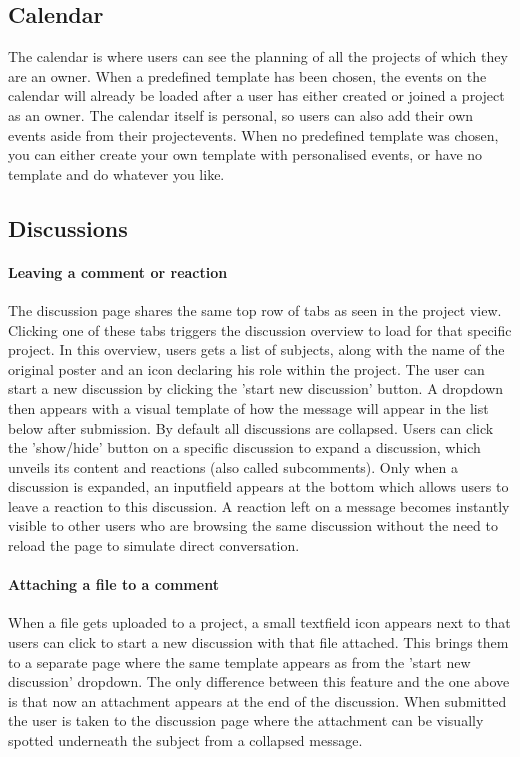 \subsection{Calendar}

The calendar is where users can see the planning of all the projects of which they are an owner.
When a predefined template has been chosen, the events on the calendar will already be loaded after
a user has either created or joined a project as an owner. The calendar itself is personal, so users can also add their own events aside from their projectevents. When no predefined template was chosen, you can either
create your own template with personalised events, or have no template and do whatever you like.

\subsection{Discussions}

\paragraph{Leaving a comment or reaction}

The discussion page shares the same top row of tabs as seen in the project view. Clicking one of these tabs
triggers the discussion overview to load for that specific project. In this overview, users gets a
list of subjects, along with the name of the original poster and an icon declaring his role within the project. The user can start a new discussion by clicking the 'start new discussion' button. A dropdown 
then appears with a visual template of how the message will appear in the list below after submission. By default all discussions are collapsed. Users can click the 'show/hide' button on a specific discussion to 
expand a discussion, which unveils its content and reactions (also called subcomments). 
Only when a discussion is expanded, an inputfield appears at the bottom which allows users to leave a reaction to this discussion. 
A reaction left on a message becomes instantly visible to other users who are browsing the same discussion without the need to reload the page to simulate direct conversation.

\paragraph{Attaching a file to a comment}

When a file gets uploaded to a project, a small textfield icon appears next to that users can click to start
a new discussion with that file attached. This brings them to a separate page where the same template appears
as from the 'start new discussion' dropdown. The only difference between this feature and the one above is that now an attachment appears at the end of the discussion. 
When submitted the user is taken to the discussion page where the attachment can be visually spotted underneath the subject from a collapsed message.

